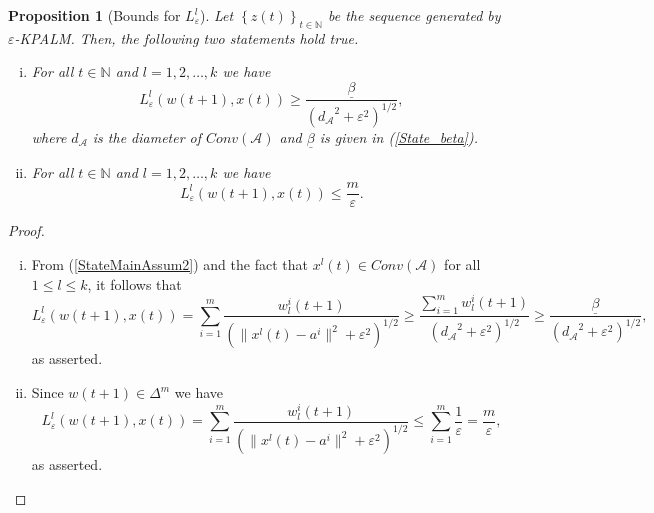 \documentclass[11pt]{article}
\numberwithin{equation}{section}
\newtheorem{proposition}{Proposition}[section]
\begin{document}
\begin{proposition}[Bounds for $L^l_{\varepsilon}$] \label{State_L_bounds}
Let $\left\lbrace z(t) \right\rbrace_{t \in \mathbb{N}}$ be the sequence generated by $\varepsilon$-KPALM. Then, the following two statements hold true.
\begin{enumerate}[(i)]
	\item For all $t \in \mathbb{N}$ and $l=1,2, \ldots, k$ we have
	\begin{equation*}
		L^l_{\varepsilon}(w(t+1),x(t)) \geq \frac{\underline{\beta}}{\left( {d_{\mathcal{A}}}^2 + {\varepsilon}^2 \right)^{1/2}} ,
	\end{equation*}
	where $d_{\mathcal{A}}$ is the diameter of $Conv(\mathcal{A})$ and $\underline{\beta}$ is given in (\ref{State_beta}). \label{State_L_bounds1}
	\item For all $t \in \mathbb{N}$ and $l=1,2, \ldots, k$ we have
	\begin{equation*}
		L^l_{\varepsilon}(w(t+1),x(t)) \leq \frac{m}{\varepsilon} .
	\end{equation*} \label{State_L_bounds2}
\end{enumerate}
\end{proposition}

\begin{proof}
\begin{enumerate}[(i)]
	\item From (\ref{StateMainAssum2}) and the fact that $x^l(t) \in Conv(\mathcal{A})$ for all $1 \leq l \leq k$, it follows that
	\begin{equation*}
		L^l_{\varepsilon}(w(t+1),x(t)) = \sum\limits_{i=1}^{m} \frac{w^i_l(t+1)}{\left( \|x^l(t) - a^i\|^2 + {\varepsilon}^2 \right)^{1/2}} \geq \frac{\sum_{i=1}^{m}w^i_l(t+1)}{\left( {d_{\mathcal{A}}}^2 + {\varepsilon}^2 \right)^{1/2}} \geq \frac{\underline{\beta}}{\left( {d_{\mathcal{A}}}^2 + {\varepsilon}^2 \right)^{1/2}} ,
	\end{equation*}
	as asserted. 
	\item Since $w(t+1) \in {\Delta}^m$ we have
	\begin{equation*}
		L^l_{\varepsilon}(w(t+1),x(t)) = \sum\limits_{i=1}^{m} \frac{w^i_l(t+1)}{\left( \|x^l(t) - a^i\|^2 + {\varepsilon}^2 \right)^{1/2}} \leq \sum\limits_{i=1}^{m} \frac{1}{\varepsilon} = \frac{m}{\varepsilon} ,
	\end{equation*}
	as asserted.
\end{enumerate}
\end{proof}
\end{document}
